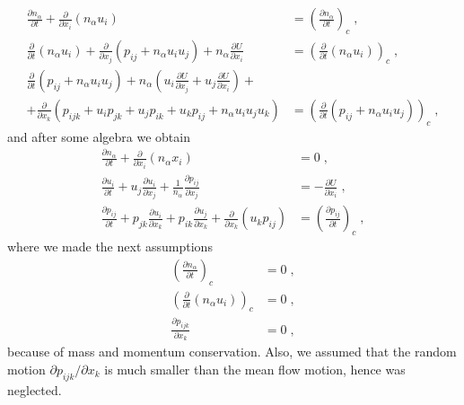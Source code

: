 \documentclass[preprint, aps, pra]{revtex4-1}
\newcommand{\pd}{\partial}
\begin{document}
\begin{equation}
  \begin{split}
    \frac{\pd n_\alpha}{\pd t} + \frac{\pd}{\pd x_i}(n_\alpha u_i) &= \left(\frac{\pd n_\alpha}{\pd t}\right)_c\;,\\
    \frac{\pd}{\pd t}(n_\alpha u_i) + \frac{\pd}{\pd x_j}(p_{ij}+n_\alpha u_iu_j)+n_\alpha\frac{\pd U}{\pd x_i} 
    &= \left(\frac{\pd}{\pd t}(n_\alpha u_i)\right)_c\;,\\
    \frac{\pd}{\pd t}(p_{ij}+n_\alpha u_iu_j)+n_\alpha\left(u_i\frac{\pd U}{\pd x_j}+u_j\frac{\pd U}{\pd x_i}\right) +& \\
    +\frac{\pd}{\pd x_k}(p_{ijk}+u_ip_{jk}+u_jp_{ik}+u_kp_{ij}+n_\alpha u_iu_ju_k) &= \left(\frac{\pd}{\pd t}(p_{ij}+n_\alpha u_iu_j)\right)_c\;,
  \end{split}
\end{equation}
and after some algebra we obtain
\begin{equation}
  \begin{split}
    \frac{\pd n_\alpha}{\pd t} + \frac{\pd}{\pd x_i}(n_\alpha x_i) &= 0\;,\\
    \frac{\pd u_i}{\pd t} + u_j\frac{\pd u_i}{\pd x_j} + \frac{1}{n_\alpha}\frac{\pd p_{ij}}{\pd x_j} &= -\frac{\pd U}{\pd x_i}\;,\\
    \frac{\pd p_{ij}}{\pd t}+p_{jk}\frac{\pd u_i}{\pd x_k} + p_{ik}\frac{\pd u_j}{\pd x_k} + \frac{\pd}{\pd x_k}(u_kp_{ij}) 
    &= \left(\frac{\pd p_{ij}}{\pd t}\right)_c\;,
  \end{split}
\end{equation}
where we made the next assumptions
\begin{equation}
  \begin{split}
    \left(\frac{\pd n_\alpha}{\pd t}\right)_c &= 0\;,\\
    \left(\frac{\pd}{\pd t}(n_\alpha u_i)\right)_c &= 0\;,\\
    \frac{\pd p_{ijk}}{\pd x_k} &= 0\;,
  \end{split}
\end{equation}
because of mass and momentum conservation. Also, we assumed that the random motion $\pd p_{ijk}/\pd x_k$ is much smaller than the mean flow
motion, hence was neglected.









  
  
\end{document}

